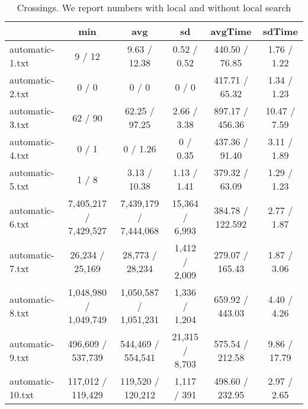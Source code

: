 \documentclass{scrartcl}
\begin{document}
\begin{table}
\begin{tabular}{lccccc}
  \toprule  & min & avg & sd & avgTime & sdTime \\ 
  \midrule automatic-1.txt & 9 / 12 & 9.63 / 12.38 & 0.52 / 0.52 & 440.50 / 76.85 & 1.76 / 1.22 \\ 
  automatic-2.txt & 0 / 0 & 0 / 0  & 0 / 0 & 417.71 / 65.32 & 1.34 / 1.23 \\ 
  automatic-3.txt & 62 / 90 & 62.25 / 97.25 & 2.66 / 3.38 & 897.17 / 456.36 & 10.47 / 7.59 \\ 
  automatic-4.txt & 0 / 1 & 0 / 1.26 & 0 / 0.35 & 437.36 / 91.40 & 3.11 / 1.89 \\ 
  automatic-5.txt & 1 / 8 & 3.13 / 10.38 & 1.13 / 1.41 & 379.32 / 63.09 & 1.29 / 1.23 \\ 
  automatic-6.txt & 7,405,217 / 7,429,527 & 7,439,179 / 7,444,068 & 15,364 / 6,993 & 384.78 / 122.592 & 2.77 / 1.87 \\ 
  automatic-7.txt & 26,234 / 25,169 & 28,773 / 28,234 & 1,412 / 2,009 & 279.07 / 165.43 & 1.87 / 3.06 \\ 
  automatic-8.txt & 1,048,980 / 1,049,749 & 1,050,587 / 1,051,231  & 1,336 / 1,204 & 659.92 / 443.03 & 4.40 / 4.26 \\ 
  automatic-9.txt & 496,609 / 537,739 & 544,469 / 554,541 & 21,315 / 8,703 & 575.54 / 212.58 & 9.86 / 17.79 \\ 
  automatic-10.txt & 117,012 / 119,429 & 119,520 / 120,212 & 1,117 / 391 & 498.60 / 232.95 & 2.97 / 2.65 \\ 
  \bottomrule 
\end{tabular}
\caption{Crossings. We report numbers with local and without local search}
\end{table}
\end{document}

